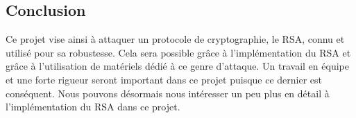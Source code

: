 \subsection{Conclusion}
Ce projet vise ainsi à attaquer un protocole de cryptographie, le RSA, connu et utilisé pour sa robustesse. Cela sera possible grâce à l'implémentation du RSA et grâce à l'utilisation de matériels dédié à ce genre d'attaque. Un travail en équipe et une forte rigueur seront important dans ce projet puisque ce dernier est conséquent. Nous pouvons désormais nous intéresser un peu plus en détail à l'implémentation du RSA dans ce projet. 

